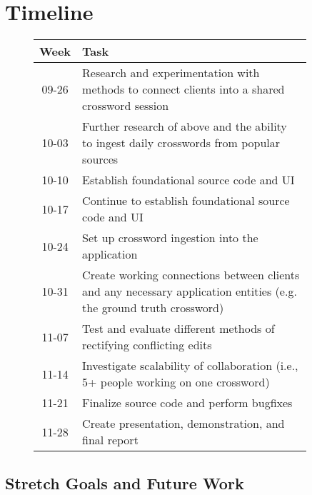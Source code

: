 \documentclass{article}
\begin{document}
\section{Timeline}
\begin{figure}[h]
  \centering
  \begin{tabular}{| c | p{0.9\linewidth} |}
    \hline
    \textbf{Week} & \textbf{Task} \\ \hline
    09-26 & Research and experimentation with methods to connect
            clients into a shared crossword session \\ \hline
    10-03 & Further research of above and the ability to
            ingest daily crosswords from popular sources \\ \hline
    10-10 & Establish foundational source code and UI \\ \hline
    10-17 & Continue to establish foundational source code and UI \\ \hline
    10-24 & Set up crossword ingestion into the application \\ \hline
    10-31 & Create working connections between clients and any
            necessary application entities (e.g. the ground truth crossword) \\ \hline
    11-07 & Test and evaluate different methods of rectifying conflicting edits  \\ \hline
    11-14 & Investigate scalability of collaboration (i.e., 5+ people working on one crossword) \\ \hline
    11-21 & Finalize source code and perform bugfixes \\ \hline
    11-28 & Create presentation, demonstration, and final report \\ \hline

    \end{tabular}
\end{figure}

\subsection{Stretch Goals and Future Work}

\newpage


\end{document}
